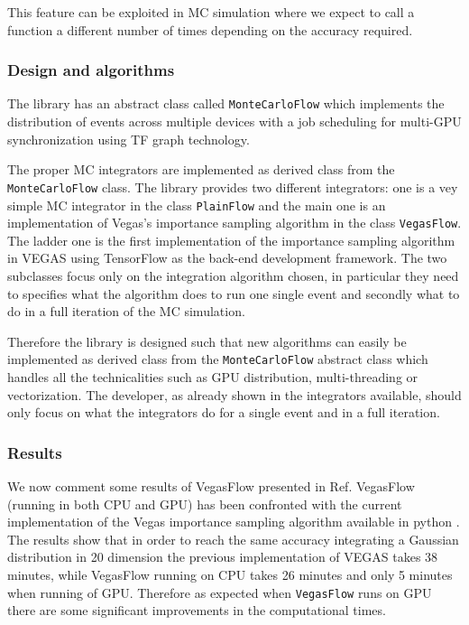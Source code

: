 \documentclass[../main/main.tex]{subfiles}
\begin{document}
This feature can be exploited in MC simulation where we expect to call a function a different number of times depending on the accuracy required. 

\subsubsection{Design and algorithms}
The library has an abstract class called \texttt{MonteCarloFlow} which implements the distribution
of events across multiple devices with a job scheduling for multi-GPU synchronization using TF graph technology.

The proper MC integrators are implemented as derived class from the \texttt{MonteCarloFlow} class. The library provides two different integrators: one is a vey simple MC integrator in the class \texttt{PlainFlow} and the main one is an implementation of Vegas's importance sampling algorithm in the class \texttt{VegasFlow}.
The ladder one is the first implementation of the importance sampling algorithm in VEGAS using TensorFlow as the back-end development framework.
The two subclasses focus only on the integration algorithm chosen, in particular they need to specifies what the algorithm does to run one single event and secondly what to do in a full iteration of the MC simulation.

Therefore the library is designed such that new algorithms can easily be implemented as derived class from the \texttt{MonteCarloFlow} abstract class which handles all the technicalities such as GPU distribution, multi-threading or vectorization.
The developer, as already shown in the integrators available, should only focus on what the integrators do for a single event and in a full iteration.

 
 \subsubsection{Results}
We now comment some results of VegasFlow presented in Ref\cite{Carrazza:2020rdn}.
VegasFlow (running in both CPU and GPU) has been confronted with the current implementation of the Vegas importance sampling algorithm available in python \cite{peter_lepage_2021_4746454}. The results show that in order to reach the same accuracy integrating a Gaussian distribution in 20 dimension the previous implementation of VEGAS takes  38 minutes, while VegasFlow running on CPU takes 26 minutes and only 5 minutes when running of GPU.
Therefore as expected when \texttt{VegasFlow} runs on GPU there are some significant improvements in the computational times.
\end{document}
